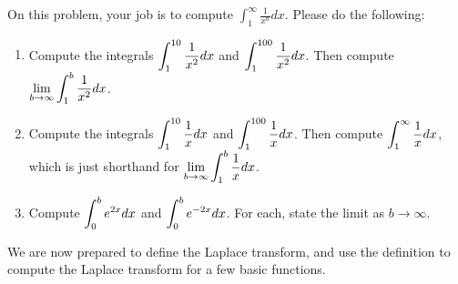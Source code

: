 \begin{problem}
 On this problem, your job is to compute $\int_1^\infty \frac{1}{x^n}dx$. Please do the following:
\begin{enumerate}
\item Compute the integrals $\displaystyle \int_1^{10} \frac{1}{x^2}dx$ and $\displaystyle \int_1^{100} \frac{1}{x^2}dx$.  Then compute $\displaystyle \lim_{b\to\infty}\int_1^{b} \frac{1}{x^2}dx$. 
\item Compute the integrals $\displaystyle \int_1^{10} \frac{1}{x}dx$ and $\displaystyle \int_1^{100} \frac{1}{x}dx$.  Then compute $\displaystyle \int_1^{\infty} \frac{1}{x}dx$, which is just shorthand for $\displaystyle \lim_{b\to\infty}\int_1^{b} \frac{1}{x}dx$.
\item Compute $\displaystyle \int_0^b e^{2x} dx$ and $\displaystyle \int_0^b e^{-2x} dx$. For each, state the limit as $b\to \infty$. 
\end{enumerate}
\end{problem}



We are now prepared to define the Laplace transform, and use the definition to compute the Laplace transform for a few basic functions.


